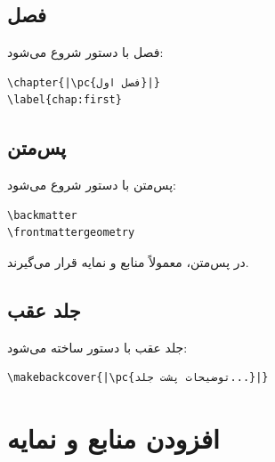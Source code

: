 \subsection{فصل}
\label{sec:first-book-chapter}

فصل با دستور  شروع می‌شود:

\begin{latin}
\begin{verbatim}
\chapter{|\pc{فصل اول}|}
\label{chap:first}
\end{verbatim}
\end{latin}


\subsection{پس‌متن}
\label{sec:first-book-backmatter}

پس‌متن با دستور  شروع می‌شود:

\begin{latin}
\begin{verbatim}
\backmatter
\frontmattergeometry
\end{verbatim}
\end{latin}

در پس‌متن، معمولاً منابع و نمایه قرار می‌گیرند.

\subsection{جلد عقب}
\label{sec:first-book-backcover}

جلد عقب با دستور  ساخته
می‌شود:

\begin{latin}
\begin{verbatim}
\makebackcover{|\pc{توضیحات پشت جلد...}|}
\end{verbatim}
\end{latin}


\section{افزودن منابع و نمایه}
\label{sec:first-book-bibliography-index}

